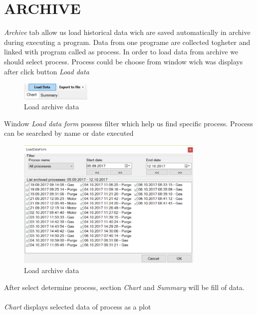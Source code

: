 \section {ARCHIVE}

\textit{Archive} tab allow us load historical data wich are saved automatically in archive during executing a program. Data from one programe are collected togheter and linked with program called as process. In order to load data from archive we should select process. Process could be choose from window wich was displays after click button \textit{Load data}  

	\begin{figure}[!h] 
	\centering \includegraphics[width=0.3\textwidth]{Graphic/Archive/LoadArchive.png}	
	\caption{Load archive data}
	\label{load_archive_data}
	\end{figure}
	\FloatBarrier

Window \textit{Load data form} possess filter which help us find specific process. Process can be searched by name or date executed

	\begin{figure}[!h] 
	\centering \includegraphics[width=0.8\textwidth]{Graphic/Archive/LoadData.png}	
	\caption{Load archive data}
	\label{load_archive_data}
	\end{figure}
	\FloatBarrier

After select determine process, section \textit{Chart} and \textit{Summary} will be fill of data.\\\\
\textit{Chart} displays selected data of process as a plot
	
